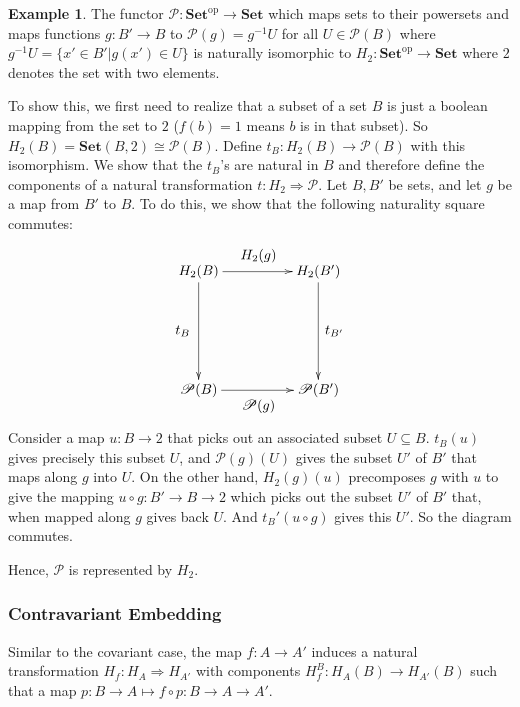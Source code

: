 \documentclass[11pt]{article}
\theoremstyle{definition}
\theoremstyle{definition}
\newtheorem{ex}{Example}
\theoremstyle{plain}
\theoremstyle{plain}
\theoremstyle{plain}
\begin{document}
\begin{ex}
The functor $\mathscr{P}:\textbf{Set}^{\text{op}} \to \textbf{Set}$ which maps sets to their powersets and maps functions $g:B' \to B$ to $\mathscr{P}(g)=g^{-1}U$ for all $U \in \mathscr{P}(B)$ where $g^{-1}U=\{x' \in B' | g(x') \in U\}$ is naturally isomorphic to $H_{2}:\textbf{Set}^{\text{op}} \to \textbf{Set}$ where $2$ denotes the set with two elements.

To show this, we first need to realize that a subset of a set $B$ is just a boolean mapping from the set to $2$ ($f(b)=1$ means $b$ is in that subset). So $H_2(B)=\textbf{Set}(B,2) \cong \mathscr{P}(B)$. Define $t_{B}:H_2(B) \to \mathscr{P}(B)$ with this isomorphism. We show that the $t_B$'s are natural in $B$ and therefore define the components of a natural transformation $t:H_2 \Rightarrow \mathscr{P}$. Let $B,B'$ be sets, and let $g$ be a map from $B'$ to $B$. To do this, we show that the following naturality square commutes:

\begin{equation*}
\begin{xy}
(0,0)*+{H_2(B)}="h2b"; (30,0)*+{H_2(B')}="h2bp"; (0,-30)*+{\mathscr{P}(B)}="pb"; (30,-30)*+{\mathscr{P}(B')}="pbp";
{\ar "h2b";"pb"}?*!/^4mm/{t_B};
{\ar "h2b";"h2bp"}?*!/_4mm/{H_2(g)};
{\ar "h2bp";"pbp"}?*!/_4mm/{t_{B'}};
{\ar "pb";"pbp"}?*!/^4mm/{\mathscr{P}(g)};
\end{xy}
\end{equation*}

Consider a map $u:B \to 2$ that picks out an associated subset $U \subseteq B$. $t_B(u)$ gives precisely this subset $U$, and $\mathscr{P}(g)(U)$ gives the subset $U'$ of $B'$ that maps along $g$ into $U$. On the other hand, $H_2(g)(u)$ precomposes $g$ with $u$ to give the mapping $u \circ g: B' \to B \to 2$ which picks out the subset $U'$ of $B'$ that, when mapped along $g$ gives back $U$. And $t_B'(u \circ g)$ gives this $U'$. So the diagram commutes.

Hence, $\mathscr{P}$ is represented by $H_2$.
\end{ex}

\subsubsection*{Contravariant Embedding}

Similar to the covariant case, the map $f:A \to A'$ induces a natural transformation $H_f: H_A \Rightarrow H_{A'}$ with components $H_f^B:H_A(B) \to H_{A'}(B)$ such that a map $p:B \to A \mapsto f \circ p: B \to A \to A'$.
\end{document}

